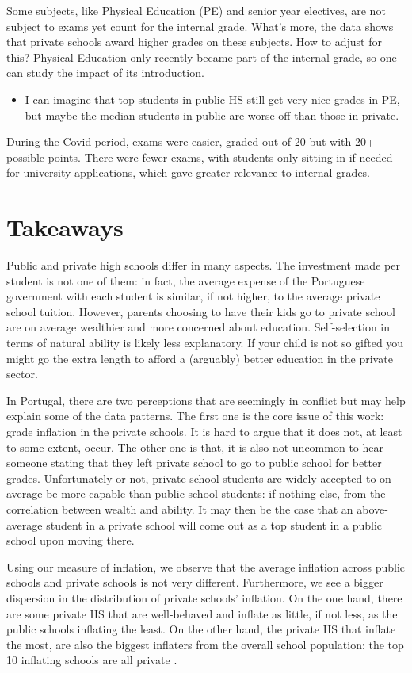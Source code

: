 \documentclass{article}
\begin{document}
Some subjects, like Physical Education (PE) and senior year electives, are not subject to exams yet count for the internal grade. What's more, the data shows that private schools award higher grades on these subjects. How to adjust for this? Physical Education only recently became part of the internal grade, so one can study the impact of its introduction.
\begin{itemize}
    \item I can imagine that top students in public HS still get very nice grades in PE, but maybe the median students in public are worse off than those in private.
\end{itemize}

During the Covid period, exams were easier, graded out of 20 but with 20+ possible points. There were fewer exams, with students only sitting in if needed for university applications, which gave greater relevance to internal grades.

\section{Takeaways}
Public and private high schools differ in many aspects. The investment made per student is not one of them: in fact, the average expense of the Portuguese government with each student is similar, if not higher, to the average private school tuition. However, parents choosing to have their kids go to private school are on average wealthier and more concerned about education. Self-selection in terms of natural ability is likely less explanatory. If your child is not so gifted you might go the extra length to afford a (arguably) better education in the private sector.

In Portugal, there are two perceptions that are seemingly in conflict but may help explain some of the data patterns. The first one is the core issue of this work: grade inflation in the private schools. It is hard to argue that it does not, at least to some extent, occur. The other one is that, it is also not uncommon to hear someone stating that they left private school to go to public school for better grades. Unfortunately or not, private school students are widely accepted to on average be more capable than public school students: if nothing else, from the correlation between wealth and ability. It may then be the case that an above-average student in a private school will come out as a top student in a public school upon moving there.

Using our measure of inflation, we observe that the average inflation across public schools and private schools is not very different. Furthermore, we see a bigger dispersion in the distribution of private schools' inflation. On the one hand, there are some private HS that are well-behaved and inflate as little, if not less, as the public schools inflating the least. On the other hand, the private HS that inflate the most, are also the biggest inflaters from the overall school population: the top 10 inflating schools are all private \citep{sapo2024}.
\end{document}
